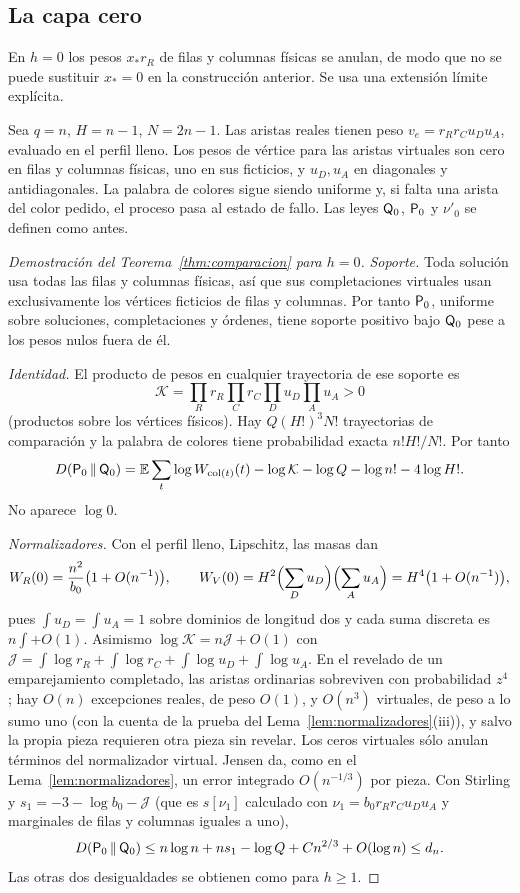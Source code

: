 \subsection{La capa cero}\label{subsec:h0}

En $h=0$ los pesos $x_*r_R$ de filas y columnas físicas se anulan, de modo que no se puede
sustituir $x_*=0$ en la construcción anterior. Se usa una extensión límite explícita.

\begin{definicion}\label{def:referencia_cero}
Sea $q=n$, $H=n-1$, $N=2n-1$. Las aristas reales tienen peso $v_e=r_Rr_Cu_Du_A$, evaluado en el
perfil lleno. Los pesos de vértice para las aristas virtuales son cero en filas y columnas
físicas, uno en sus ficticios, y $u_D,u_A$ en diagonales y antidiagonales. La palabra de colores
sigue siendo uniforme y, si falta una arista del color pedido, el proceso pasa al estado de
fallo. Las leyes $\mathsf{Q}_0$, $\mathsf{P}_0$ y $\nu'_0$ se definen como antes.
\end{definicion}

\begin{proof}[Demostración del Teorema~\ref{thm:comparacion} para $h=0$]
\emph{Soporte.} Toda solución usa todas las filas y columnas físicas, así que sus completaciones
virtuales usan exclusivamente los vértices ficticios de filas y columnas. Por tanto $\mathsf{P}_0$,
uniforme sobre soluciones, completaciones y órdenes, tiene soporte positivo bajo $\mathsf{Q}_0$ pese a
los pesos nulos fuera de él.

\emph{Identidad.} El producto de pesos en cualquier trayectoria de ese soporte es
\[
 \mathcal K=\prod_{R}r_R\prod_{C}r_C\prod_{D}u_D\prod_{A}u_A>0
\]
(productos sobre los vértices físicos). Hay $Q(H!)^3N!$ trayectorias de comparación y la
palabra de colores tiene probabilidad exacta $n!H!/N!$. Por tanto
\[
 D(\mathsf{P}_0\,\Vert\,\mathsf{Q}_0)=\mathbb{E}\sum_t\log W_{\mathrm{col}(t)}(t)-\log\mathcal K-\log Q-\log n!-4\log H! .
\]
No aparece $\log0$.

\emph{Normalizadores.} Con el perfil lleno, Lipschitz, las masas dan
\[
 W_R(0)=\frac{n^2}{b_0}\bigl(1+O(n^{-1})\bigr),\qquad
 W_V(0)=H^2\Bigl(\sum_Du_D\Bigr)\Bigl(\sum_Au_A\Bigr)=H^4\bigl(1+O(n^{-1})\bigr),
\]
pues $\int u_D=\int u_A=1$ sobre dominios de longitud dos y cada suma discreta es
$n\int+O(1)$. Asimismo $\log\mathcal K=n\mathcal J+O(1)$ con
$\mathcal J=\int\log r_R+\int\log r_C+\int\log u_D+\int\log u_A$. En el revelado de un
emparejamiento completado, las aristas ordinarias sobreviven con probabilidad $z^4$; hay
$O(n)$ excepciones reales, de peso $O(1)$, y $O(n^3)$ virtuales, de peso a lo sumo uno (con la
cuenta de la prueba del Lema~\ref{lem:normalizadores}(iii)), y salvo la propia pieza requieren
otra pieza sin revelar. Los ceros virtuales sólo anulan
términos del normalizador virtual. Jensen da, como en el Lema~\ref{lem:normalizadores}, un error integrado
$O(n^{-1/3})$ por pieza. Con Stirling y $s_1=-3-\log b_0-\mathcal J$ (que es $s[\nu_1]$ calculado
con $\nu_1=b_0r_Rr_Cu_Du_A$ y marginales de filas y columnas iguales a uno),
\[
 D(\mathsf{P}_0\,\Vert\,\mathsf{Q}_0)\le n\log n+ns_1-\log Q+Cn^{2/3}+O(\log n)\le d_n .
\]
Las otras dos desigualdades se obtienen como para $h\ge1$.
\end{proof}

